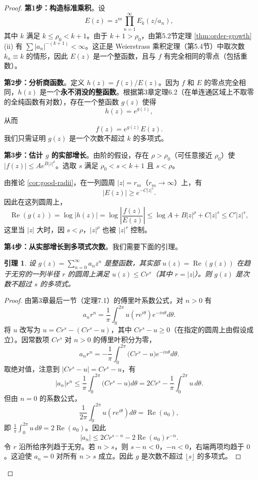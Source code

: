 \documentclass[UTF8]{ctexart}
\newtheorem{lemma}[theorem]{引理}
\numberwithin{equation}{section}
\begin{document}
\begin{proof}
\textbf{第1步：构造标准乘积}。设
\[
E(z) = z^m \prod_{n=1}^\infty E_k(z/a_n),
\]
其中 \(k\) 满足 \(k \le \rho_0 < k+1\)。由于 \(k+1 > \rho_0\)，由第5.2节定理 \ref{thm:order-growth} (ii) 有 \(\sum |a_n|^{-(k+1)} < \infty\)。这正是 Weierstrass 乘积定理（第5.4节）中取次数 \(k_n \equiv k\) 的情形，因此 \(E(z)\) 是一个整函数，且与 \(f\) 有完全相同的零点（包括重数）。

\textbf{第2步：分析商函数}。定义 \(h(z) = f(z)/E(z)\)。因为 \(f\) 和 \(E\) 的零点完全相同，\(h(z)\) 是一个\textbf{永不消没的整函数}。根据第3章定理6.2（在单连通区域上不取零的全纯函数有对数），存在一个整函数 \(g(z)\) 使得
\[
h(z) = e^{g(z)},
\]
从而
\[
f(z) = e^{g(z)} E(z).
\]
我们只需证明 \(g(z)\) 是一个次数不超过 \(k\) 的多项式。

\textbf{第3步：估计 \(g\) 的实部增长}。由阶的假设，存在 \(\rho > \rho_0\)（可任意接近 \(\rho_0\)）使 \(|f(z)| \le A e^{B|z|^\rho}\)。选取 \(s\) 满足 \(\rho_0 < s < k+1\) 且 \(s < \rho\)。

由推论 \ref{cor:good-radii}，在一列圆周 \(|z| = r_m\)（\(r_m \to \infty\)）上，有
\[
|E(z)| \ge e^{-C|z|^s}.
\]
因此在这列圆周上，
\[
\operatorname{Re}(g(z)) = \log|h(z)| = \log\left|\frac{f(z)}{E(z)}\right|
\le \log A + B|z|^\rho + C|z|^s \le C' |z|^s,
\]
这里当 \(|z|\) 大时，因 \(s < \rho\)，\(|z|^\rho\) 也被 \(|z|^s\) 控制。

\textbf{第4步：从实部增长到多项式次数}。我们需要下面的引理。

\begin{lemma}\label{lem:growth-poly}
设 \(g(z) = \sum_{n=0}^\infty a_n z^n\) 是整函数，其实部 \(u(z) = \operatorname{Re}(g(z))\) 在趋于无穷的一列半径 \(r\) 的圆周上满足 \(u(z) \le C r^s\)（其中 \(r = |z|\)）。则 \(g(z)\) 是次数不超过 \(s\) 的多项式。
\end{lemma}

\begin{proof}
由第3章最后一节（定理7.1）的傅里叶系数公式，对 \(n > 0\) 有
\[
a_n r^n = \frac{1}{\pi} \int_0^{2\pi} u(r e^{i\theta}) e^{-in\theta} d\theta.
\]
将 \(u\) 改写为 \(u = C r^s - (C r^s - u)\)，其中 \(C r^s - u \ge 0\)（在指定的圆周上由假设成立）。因常数项 \(C r^s\) 对 \(n>0\) 的傅里叶积分为零，
\[
a_n r^n = -\frac{1}{\pi} \int_0^{2\pi} \bigl( C r^s - u \bigr) e^{-in\theta} d\theta.
\]
取绝对值，注意到 \(|C r^s - u| = C r^s - u\)，有
\[
|a_n| r^n \le \frac{1}{\pi} \int_0^{2\pi} \bigl( C r^s - u \bigr) d\theta
= 2C r^s - \frac{1}{\pi} \int_0^{2\pi} u \, d\theta.
\]
但由 \(n=0\) 的系数公式，
\[
\frac{1}{2\pi} \int_0^{2\pi} u(r e^{i\theta}) d\theta = \operatorname{Re}(a_0),
\]
即 \(\frac{1}{\pi} \int_0^{2\pi} u \, d\theta = 2\operatorname{Re}(a_0)\)。因此
\[
|a_n| \le 2C r^{s-n} - 2\operatorname{Re}(a_0) r^{-n}.
\]
令 \(r\) 沿所给序列趋于无穷。若 \(n > s\)，则 \(s-n < 0\)，\(-n < 0\)，右端两项均趋于 \(0\)。这迫使 \(a_n = 0\) 对所有 \(n > s\) 成立。因此 \(g\) 是次数不超过 \(\lfloor s \rfloor\) 的多项式。
\end{proof}


\end{proof}
\end{document}
